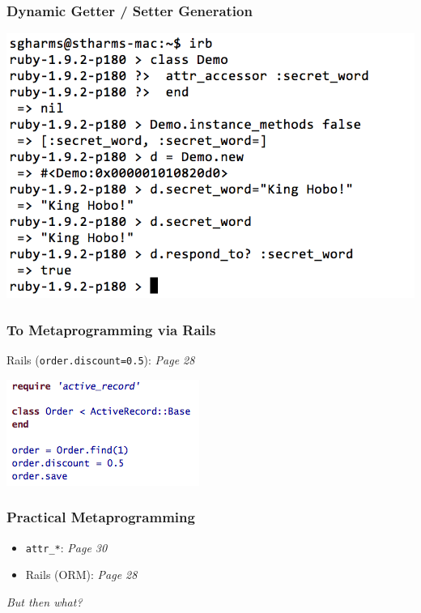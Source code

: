 \documentclass[slidestop,compress,mathserif]{beamer}
\begin{document}
\begin{frame}
	\frametitle{Dynamic Getter / Setter Generation}
	\includegraphics[scale=0.45]{img/attr_demo_1.png}
\end{frame}

\begin{frame} \frametitle{To Metaprogramming via Rails}
	Rails (\texttt{order.discount=0.5}):  \emph{Page 28}
	\begin{center}
		\includegraphics[scale=0.55]{img/awdwr_mp.png}
	\end{center}
\end{frame}

\begin{frame}
	\frametitle{Practical Metaprogramming}
	\begin{itemize}
		\item \texttt{attr\_*}:  \emph{Page 30}
		\item Rails (ORM):  \emph{Page 28}
	\end{itemize}
	\pause
	\vskip 0.5cm
	\emph{But then what?}
\end{frame}
\end{document}
